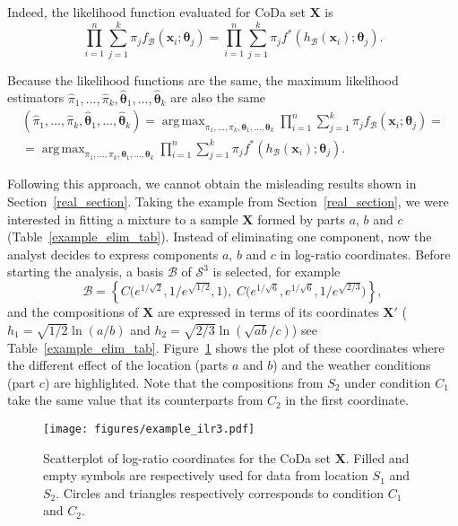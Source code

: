 \documentclass[12pt, a4paper]{article}
\newcommand{\m}[1]{\boldsymbol{#1}}
\DeclareMathOperator*{\argmax}{arg\,max}
\begin{document}
Indeed, the likelihood function evaluated for CoDa set $\mathbf{X}$ is
\begin{equation}\label{likeli1}
\prod_{i=1}^n \sum_{j=1}^k \pi_j f_\mathcal{B}(\textbf{x}_i; \m\theta_j)=\prod_{i=1}^n \sum_{j=1}^k \pi_j f^*(h_\mathcal{B}(\textbf{x}_i); \m\theta_j).
\end{equation}

Because the likelihood functions are the same,  the maximum likelihood estimators $\hat{\pi}_1, \dots, \hat{\pi}_k, \hat{\m\theta}_1, \dots, \hat{\m\theta}_k$ are also the same
\begin{eqnarray}\label{likeli2}
\left( \hat{\pi}_1, \dots, \hat{\pi}_k, \hat{\m\theta}_1, \dots, \hat{\m\theta}_k\right) = \argmax_{\pi_1, \dots, \pi_k, \m\theta_1, \dots, \m\theta_k} \prod_{i=1}^n \sum_{j=1}^k \pi_j f_\mathcal{B}(\textbf{x}_i; \m\theta_j) = \\ 
= \argmax_{\pi_1, \dots, \pi_k, \m\theta_1, \dots, \m\theta_k} \prod_{i=1}^n \sum_{j=1}^k \pi_j f^*(h_\mathcal{B}(\textbf{x}_i); \m\theta_j).
\end{eqnarray}


Following this approach, we cannot obtain the misleading results shown in Section~\ref{real_section}. Taking the example from Section~\ref{real_section}, we were interested in fitting a mixture to a sample $\mathbf{X}$ formed by parts $a$, $b$ and $c$ (Table~\ref{example_elim_tab}). Instead of eliminating one component, now the analyst decides to express components $a$, $b$ and $c$ in log-ratio coordinates. Before starting the analysis, a basis $\mathcal{B}$ of $\mathcal{S}^3$ is selected, for example
\begin{equation}\label{basis3}
\mathcal{B} = \left\{ C\Big( e^{1/\sqrt{2}}, 1/e^{\sqrt{1/2}}, 1 \Big), \; C\Big( e^{1/\sqrt{6}}, e^{1/\sqrt{6}}, 1/e^{\sqrt{2/3}} \Big) \right\},
\end{equation}
and the compositions of $\mathbf{X}$ are expressed in terms of its coordinates 
$\mathbf{X}'$ ($h_1 = \sqrt{1/2} \ln(a/b)$ and $h_2 = \sqrt{2/3} \ln(\sqrt{ab} / c)$) see Table~\ref{example_elim_tab}. Figure~\ref{example_ilr3} shows the plot of these coordinates where the different effect of the location (parts $a$ and $b$) and the weather conditions (part $c$) are highlighted. Note that the compositions from $S_2$ under condition $C_1$ take the same value that its counterparts from $C_2$ in the first coordinate. 



\begin{figure}[thbp]
\centering
\texttt{[image: figures/example\_ilr3.pdf]}
\caption{Scatterplot of log-ratio coordinates for the CoDa set $\mathbf{X}$. Filled and empty symbols are respectively used for data from location $S_1$ and $S_2$. Circles and triangles respectively corresponds to condition $C_1$ and $C_2$.}\label{example_ilr3}
\end{figure}
\end{document}
